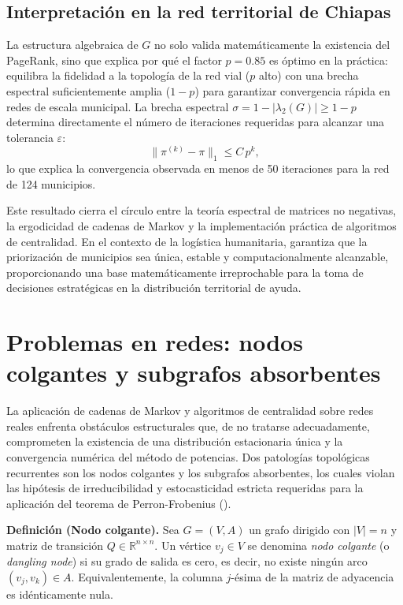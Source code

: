 \documentclass[
  spanish,
  us-letterpaper,
]{scrreprt}
\numberwithin{equation}{section}
\begin{document}
\subsection{Interpretación en la red territorial de
Chiapas}\label{interpretaciuxf3n-en-la-red-territorial-de-chiapas}

La estructura algebraica de \(G\) no solo valida matemáticamente la
existencia del PageRank, sino que explica por qué el factor \(p=0.85\)
es óptimo en la práctica: equilibra la fidelidad a la topología de la
red vial (\(p\) alto) con una brecha espectral suficientemente amplia
(\(1-p\)) para garantizar convergencia rápida en redes de escala
municipal. La brecha espectral \(\sigma = 1 - |\lambda_2(G)| \geq 1-p\)
determina directamente el número de iteraciones requeridas para alcanzar
una tolerancia \(\varepsilon\): \[
\|\pi^{(k)} - \pi\|_1 \leq C \, p^k,
\] lo que explica la convergencia observada en menos de 50 iteraciones
para la red de 124 municipios.

Este resultado cierra el círculo entre la teoría espectral de matrices
no negativas, la ergodicidad de cadenas de Markov y la implementación
práctica de algoritmos de centralidad. En el contexto de la logística
humanitaria, garantiza que la priorización de municipios sea única,
estable y computacionalmente alcanzable, proporcionando una base
matemáticamente irreprochable para la toma de decisiones estratégicas en
la distribución territorial de ayuda.

\section{Problemas en redes: nodos colgantes y subgrafos
absorbentes}\label{problemas-en-redes-nodos-colgantes-y-subgrafos-absorbentes}

La aplicación de cadenas de Markov y algoritmos de centralidad sobre
redes reales enfrenta obstáculos estructurales que, de no tratarse
adecuadamente, comprometen la existencia de una distribución
estacionaria única y la convergencia numérica del método de potencias.
Dos patologías topológicas recurrentes son los nodos colgantes y los
subgrafos absorbentes, los cuales violan las hipótesis de
irreducibilidad y estocasticidad estricta requeridas para la aplicación
del teorema de Perron-Frobenius
().

\textbf{Definición (Nodo colgante).} Sea \(G = (V, A)\) un grafo
dirigido con \(|V| = n\) y matriz de transición
\(Q \in \mathbb{R}^{n \times n}\). Un vértice \(v_j \in V\) se denomina
\emph{nodo colgante} (o \emph{dangling node}) si su grado de salida es
cero, es decir, no existe ningún arco \((v_j, v_k) \in A\).
Equivalentemente, la columna \(j\)-ésima de la matriz de adyacencia es
idénticamente nula.
\end{document}
